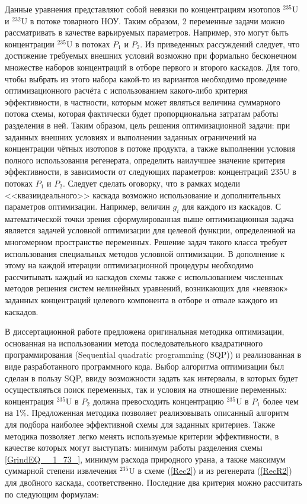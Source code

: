 Данные уравнения представляют собой невязки по концентрациям изотопов $^{235}$U и $^{232}$U в потоке товарного НОУ. Таким образом, 2 переменные задачи можно рассматривать в качестве варьируемых параметров. Например, это могут быть концентрации  $^{235}$U в потоках $P_{1}$ и $P_{2}$. Из приведенных рассуждений следует, что достижение требуемых внешних условий возможно при формально бесконечном множестве наборов концентраций в отборе первого и второго каскадов. Для того, чтобы выбрать из этого набора какой-то из вариантов необходимо проведение оптимизационного расчёта с использованием какого-либо критерия эффективности, в частности, которым может являться величина суммарного потока схемы, которая фактически будет пропорциональна затратам работы разделения в ней. 
Таким образом, цель решения оптимизационной задачи: при заданных внешних условиях и выполнении заданных ограничений на концентрации чётных изотопов в потоке продукта, а также выполнении условия полного использования регенерата, определить наилучшее значение критерия эффективности, в зависимости от следующих параметров: концентраций 235U в потоках $P_{1}$ и $P_{2}$.
Следует сделать оговорку, что в рамках модели <<квазиидеального>> каскада возможно использование и дополнительных параметров оптимизации. Например, величин $g_{i}$ для каждого из каскадов. 
С математической точки зрения сформулированная выше оптимизационная задача является задачей условной оптимизации для целевой функции, определенной на многомерном пространстве переменных. Решение задач такого класса требует использования специальных методов условной оптимизации. В дополнение к этому на каждой итерации оптимизационной процедуры необходимо рассчитывать каждый из каскадов схемы также с использованием численных методов решения систем нелинейных уравнений, возникающих для «невязок» заданных концентраций целевого компонента в отборе и отвале каждого из каскадов. 
 
В диссертационной работе предложена оригинальная методика оптимизации, основанная на использовании метода последовательного квадратичного программирования (Sequential quadratic programming (SQP)) и реализованная в виде разработанного программного кода. Выбор алгоритма оптимизации был сделан в пользу SQP, ввиду возможности задать как интервалы, в которых будет осуществляться поиск переменных, так и условия на отношение переменных: концентрация $^{235}$U в $P_2$ должна превосходить концентрацию $^{235}$U в $P_1$ более чем на 1\%. Предложенная методика позволяет реализовывать описанный алгоритм для подбора наиболее эффективной схемы для заданных критериев. Также методика позволяет легко менять используемые критерии эффективности, в качестве которых могут выступать: минимум работы разделения схемы \ref{GrindEQ__1_73_}, минимум расхода природного урана, а также максимум суммарной степени извлечения $^{235}$U в схеме (\ref{Rec2}) и из регенерата (\ref{RecR2}) для двойного каскада, соответственно. Последние два критерия можно рассчитать по следующим формулам:

